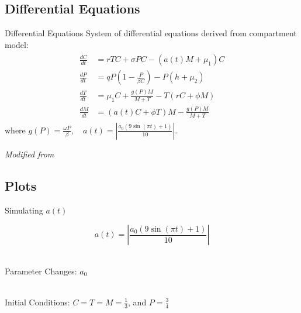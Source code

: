 \documentclass{beamer}
\begin{document}
\subsection{Differential Equations}
\begin{frame}{Differential Equations}
    System of differential equations derived from compartment model:
    \begin{align*}
        \begin{split}
            \frac{dC}{dt} &= rTC + \sigma PC- (a(t)M+\mu_{1})C\\
            \frac{dP}{dt} &= qP \left( 1-\frac{P}{\beta C} \right) - P \left( h+\mu_{2} \right)\\
            \frac{dT}{dt} &= \mu_{1}C + \frac{g(P)M}{M+T} - T(rC+\phi M)\\
            \frac{dM}{dt} &= (a(t)C+ \phi T)M - \frac{g(P)M}{M+T}
            \label{SoODE}
        \end{split}
    \end{align*}
    where $g(P) = \frac{\omega P}{\beta}, \quad a(t)=|\frac{a_{0}(9\sin{(\pi t) }+1)}{10}|$.\\ 
    \quad
    \begin{center}
        {\small \textit{Modified from \cite{13_blackwood_hastings_mumby_2010}}}
    \end{center}
\end{frame}

\subsection{Plots}
\begin{frame}{Simulating $a(t)$}
    \begin{center}
        $$a(t)= \left|\frac{a_{0}(9\sin{(\pi t) }+1)}{10} \right|$$\\
    \end{center}
    
\end{frame}

\begin{frame}{Parameter Changes: $a_{0}$}
    \begin{center}
        \\
        Initial Conditions: $C = T = M = \frac{1}{3}$, and $P = \frac{3}{4}$
    \end{center}
\end{frame}
\end{document}
